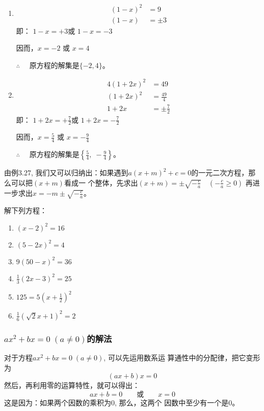 \begin{solution}
\begin{enumerate}
    \item \begin{align*}
        (1-x)^2&=9\\
        (1-x)&=\pm 3 \tag{平方根的意义}
    \end{align*}
    即：    $1-x=+3$或    $1-x=-3$

    因而，$x=-2$ 或    $x=4$

 $\therefore\quad $   原方程的解集是$\{-2,4\}$。
    \item \begin{align*}
        4(1+2x)^2&=49\\
        (1+2x)^2&=\frac{49}{4}  \tag{两边除以4}\\
        1+2x&=\pm\frac{7}{2} \tag{平方根的意义}
    \end{align*}
    即：    $1+2x=+\frac{7}{2}$或    $1+2x=-\frac{7}{2}$

    因而，$x=\frac{5}{4}$ 或    $x=-\frac{9}{4}$   

    $\therefore\quad $   原方程的解集是$\left\{\frac{5}{4},\; -\frac{9}{4}\right\}$。

\end{enumerate} 
\end{solution}

由例3.27, 我们又可以归纳出：如果遇到$a(x+m)^2
+c=0$的一元二次方程，那么可以把$(x+m)$看成一
个整体，先求出$(x+m)=\pm\sqrt{-\frac{c}{a}}\quad \left(-\frac{c}{a}\ge 0\right)$
再进一步求出$x=-m\pm\sqrt{-\frac{c}{a}}$。

\begin{ex}
解下列方程：
\begin{multicols}{2}
    \begin{enumerate}
\item $(x-2)^{2}=16$
\item $(5-2 x)^{2}=4$
\item $9(50-x)^{2}=36$
\item $\frac{1}{3}(2 x-3)^{2}=25$
\item $125=5\left(x+\frac{1}{2}\right)^{2}$
\item $\frac{1}{6}(\sqrt{2} x+1)^{2}=2$
    \end{enumerate}
\end{multicols}
\end{ex}

\subsubsection{$ax^2+bx=0\; (a\ne 0)$的解法}
对于方程$ax^2+bx=0\; (a\ne 0)$, 可以先运用数系运
算通性中的分配律，把它变形为
\[(ax+b)x=0\]
然后，再利用零的运算特性，就可以得出：
\[ax+b=0\qquad  \text{或}\qquad x=0\]
这是因为：如果两个因数的乘积为0, 那么，这两个
因数中至少有一个是0。

